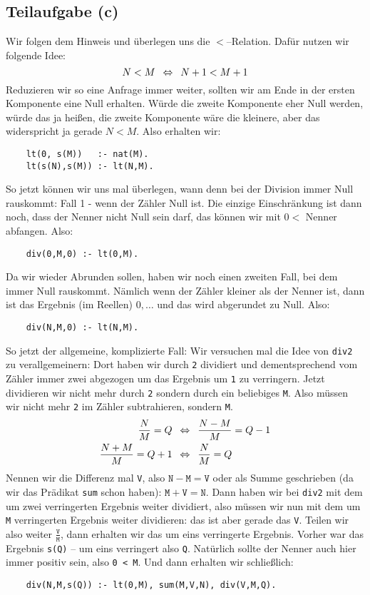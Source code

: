 \documentclass[ngerman, a4paper, 11pt]{article}
\theoremstyle{nonumberplain}
\begin{document}
\pagebreak

\subsection*{Teilaufgabe (c)}

Wir folgen dem Hinweis und überlegen uns die $<$--Relation. Dafür nutzen wir folgende Idee:
\begin{equation*}
	N < M \enskip \Leftrightarrow \enskip N + 1 < M + 1
\end{equation*}
Reduzieren wir so eine Anfrage immer weiter, sollten wir am Ende in der ersten Komponente eine Null erhalten. Würde die zweite Komponente eher Null werden, würde das ja heißen, die zweite Komponente wäre die kleinere, aber das widerspricht ja gerade $N<M$. Also erhalten wir:
\begin{lstlisting}
	lt(0, s(M))   :- nat(M).  
	lt(s(N),s(M)) :- lt(N,M).
\end{lstlisting}

So jetzt können wir uns mal überlegen, wann denn bei der Division immer Null rauskommt: Fall 1 - wenn der Zähler Null ist. Die einzige Einschränkung ist dann noch, dass der Nenner nicht Null sein darf, das können wir mit $0<\text{ Nenner}$ abfangen. Also:
\begin{lstlisting}
	div(0,M,0) :- lt(0,M). 
\end{lstlisting}
Da wir wieder Abrunden sollen, haben wir noch einen zweiten Fall, bei dem immer Null rauskommt. Nämlich wenn der Zähler kleiner als der Nenner ist, dann ist das Ergebnis (im Reellen) $0,\dots$ und das wird abgerundet zu Null. Also:
\begin{lstlisting}
	div(N,M,0) :- lt(N,M).
\end{lstlisting}
So jetzt der allgemeine, komplizierte Fall: Wir versuchen mal die Idee von \texttt{div2} zu verallgemeinern: Dort haben wir durch \texttt{2} dividiert und dementsprechend vom Zähler immer zwei abgezogen um das Ergebnis um \texttt{1} zu verringern. 
Jetzt dividieren wir nicht mehr durch \texttt{2} sondern durch ein beliebiges \texttt{M}. Also müssen wir nicht mehr \texttt{2} im Zähler subtrahieren, sondern \texttt{M}. 
\begin{align*}
	\frac{N}{M} = Q &\enskip \Leftrightarrow \enskip \frac{N-M}{M} = Q - 1 \\
	\frac{N+M}{M} = Q +1 &\enskip \Leftrightarrow \enskip \frac{N}{M} = Q 
\end{align*}
Nennen wir die Differenz mal \texttt{V}, also $\texttt{N}-\texttt{M}=\texttt{V}$ oder als Summe geschrieben (da wir das Prädikat \texttt{sum} schon haben): $\texttt{M}+\texttt{V}=\texttt{N}$. Dann haben wir bei \texttt{div2} mit dem um zwei verringerten Ergebnis weiter dividiert, also müssen wir nun mit dem um \texttt{M} verringerten Ergebnis weiter dividieren: das ist aber gerade das \texttt{V}. Teilen wir also weiter $\frac{\texttt{V}}{\texttt{M}}$, dann erhalten wir das um eins verringerte Ergebnis. Vorher war das Ergebnis \texttt{s(Q)} -- um eins verringert also \texttt{Q}. Natürlich sollte der Nenner auch hier immer positiv sein, also \texttt{0 < M}. Und dann erhalten wir schließlich:
\begin{lstlisting}
	div(N,M,s(Q)) :- lt(0,M), sum(M,V,N), div(V,M,Q).
\end{lstlisting}
\end{document}

